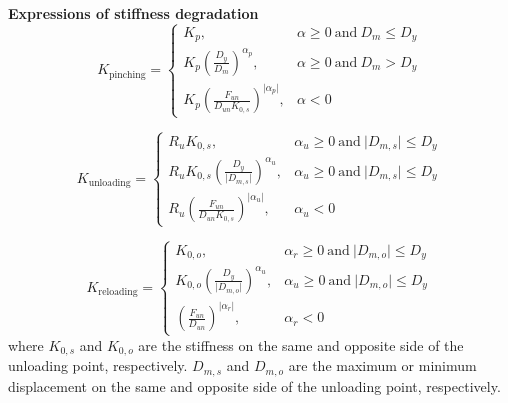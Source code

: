 \documentclass[12pt, landscape]{article}
\begin{document}
\begin{minipage}[t]{0.48\textwidth}
\textbf{Expressions of stiffness degradation}
\begin{equation}
K_{\mathrm{pinching}} = \begin{cases}
K_{p}, & \alpha \geq 0 \ \mathrm{and} \ D_m \leq D_y \\ 
K_{p}\left(\frac{D_y}{D_m}\right)^{\alpha_p}, & \alpha \geq 0 \ \mathrm{and} \ D_m > D_y \\ 
K_{p}\left(\frac{F_{un}}{D_{un}K_{0,s}}\right)^{\lvert\alpha_p\rvert}, & \alpha < 0
\end{cases}
\end{equation}

\begin{equation}
K_{\mathrm{unloading}} = \begin{cases}
R_uK_{0,s}, & \alpha_u \geq 0 \ \mathrm{and} \ \lvert D_{m,s}\rvert \leq D_y \\
R_uK_{0,s} \left(\frac{D_y}{\lvert D_{m,s}\rvert}\right)^{\alpha_u}, & \alpha_u \geq 0 \ \mathrm{and} \ \lvert D_{m,s}\rvert \leq D_y \\
R_u \left(\frac{F_{un}}{D_{un}K_{0,s}}\right)^{\lvert\alpha_u\rvert}, & \alpha_u < 0
\end{cases}
\end{equation}

\begin{equation}
K_{\mathrm{reloading}} = \begin{cases}
K_{0,o}, & \alpha_r \geq 0 \ \mathrm{and} \ \lvert D_{m,o}\rvert \leq D_y \\
K_{0,o} \left(\frac{D_y}{\lvert D_{m,o}\rvert}\right)^{\alpha_u}, & \alpha_u \geq 0 \ \mathrm{and} \ \lvert D_{m,o}\rvert \leq D_y \\
\left(\frac{F_{un}}{D_{un}}\right)^{\lvert\alpha_r\rvert}, & \alpha_r < 0
\end{cases}
\end{equation}
where $K_{0,s}$ and $K_{0,o}$ are the stiffness on the same and opposite side of the unloading point, respectively. $D_{m,s}$ and $D_{m,o}$ are the maximum or minimum displacement on the same and opposite side of the unloading point, respectively. 
\end{minipage}
\end{document}
